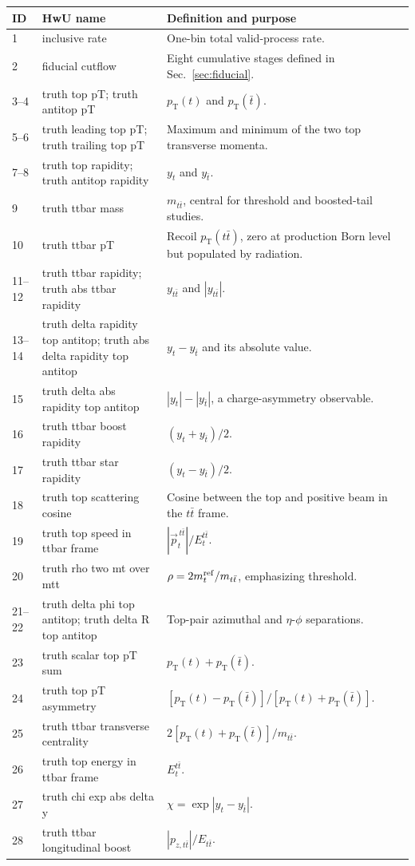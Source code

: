 \documentclass[10pt,a4paper]{article}
\newcommand{\ttbar}{t\bar t}
\newcommand{\pt}{p_{\mathrm T}}
\newcommand{\hist}[1]{\textsf{#1}}
\begin{document}
\begin{longtable}{L{1.1cm}L{5.7cm}L{9.0cm}}
\toprule ID & HwU name & Definition and purpose\\ \midrule{} & \hist{inclusive rate} & One-bin total valid-process rate.\\
2 & \hist{fiducial cutflow} & Eight cumulative stages defined in Sec.~\ref{sec:fiducial}.\\
3--4 & \hist{truth top pT}; \hist{truth antitop pT} & \(\pt(t)\) and \(\pt(\bar t)\).\\
5--6 & \hist{truth leading top pT}; \hist{truth trailing top pT} & Maximum and minimum of the two top transverse momenta.\\
7--8 & \hist{truth top rapidity}; \hist{truth antitop rapidity} & \(y_t\) and \(y_{\bar t}\).\\
9 & \hist{truth ttbar mass} & \(m_{\ttbar}\), central for threshold and boosted-tail studies.\\
10 & \hist{truth ttbar pT} & Recoil \(\pt(\ttbar)\), zero at production Born level but populated by radiation.\\
11--12 & \hist{truth ttbar rapidity}; \hist{truth abs ttbar rapidity} & \(y_{\ttbar}\) and \(|y_{\ttbar}|\).\\
13--14 & \hist{truth delta rapidity top antitop}; \hist{truth abs delta rapidity top antitop} & \(y_t-y_{\bar t}\) and its absolute value.\\
15 & \hist{truth delta abs rapidity top antitop} & \(|y_t|-|y_{\bar t}|\), a charge-asymmetry observable.\\
16 & \hist{truth ttbar boost rapidity} & \((y_t+y_{\bar t})/2\).\\
17 & \hist{truth ttbar star rapidity} & \((y_t-y_{\bar t})/2\).\\
18 & \hist{truth top scattering cosine} & Cosine between the top and positive beam in the \(\ttbar\) frame.\\
19 & \hist{truth top speed in ttbar frame} & \(|\vec p_t^{\,\ttbar}|/E_t^{\ttbar}\).\\
20 & \hist{truth rho two mt over mtt} & \(\rho=2m_t^{\rm ref}/m_{\ttbar}\), emphasizing threshold.\\
21--22 & \hist{truth delta phi top antitop}; \hist{truth delta R top antitop} & Top-pair azimuthal and \(\eta\)-\(\phi\) separations.\\
23 & \hist{truth scalar top pT sum} & \(\pt(t)+\pt(\bar t)\).\\
24 & \hist{truth top pT asymmetry} & \([\pt(t)-\pt(\bar t)]/[\pt(t)+\pt(\bar t)]\).\\
25 & \hist{truth ttbar transverse centrality} & \(2[\pt(t)+\pt(\bar t)]/m_{\ttbar}\).\\
26 & \hist{truth top energy in ttbar frame} & \(E_t^{\ttbar}\).\\
27 & \hist{truth chi exp abs delta y} & \(\chi=\exp|y_t-y_{\bar t}|\).\\
28 & \hist{truth ttbar longitudinal boost} & \(|p_{z,\ttbar}|/E_{\ttbar}\).\\
\bottomrule
\end{longtable}
\end{document}
